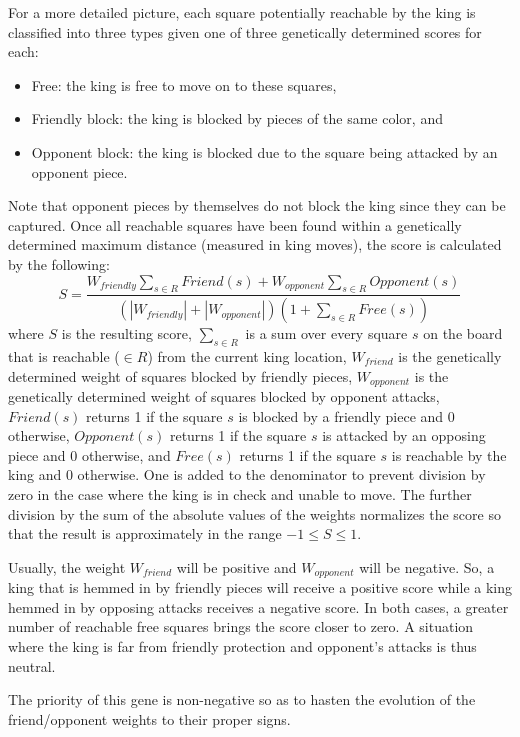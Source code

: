 \documentclass[letterpaper]{article}
\renewcommand{\_}{\allowbreak\textunderscore\allowbreak}
\begin{document}
For a more detailed picture, each square potentially reachable by the king is classified into three types given one of three genetically determined scores for each:
\begin{itemize}
	\item Free: the king is free to move on to these squares,
	\item Friendly block: the king is blocked by pieces of the same color, and
	\item Opponent block: the king is blocked due to the square being attacked by an opponent piece.
\end{itemize}
Note that opponent pieces by themselves do not block the king since they can be captured. Once all reachable squares have been found within a genetically determined maximum distance (measured in king moves), the score is calculated by the following:
\[S = \frac{W_{friendly}\sum_{s \in R}Friend(s) + W_{opponent}\sum_{s \in R}Opponent(s)}{\left(\left|W_{friendly}\right| + \left|W_{opponent}\right|\right)\left(1 + \sum_{s \in R}Free(s)\right)}
\]
where \(S\) is the resulting score, \(\sum_{s \in R}\) is a sum over every square \(s\) on the board that is reachable (\(\in R\)) from the current king location, \(W_{friend}\) is the genetically determined weight of squares blocked by friendly pieces, \(W_{opponent}\) is the genetically determined weight of squares blocked by opponent attacks, \(Friend(s)\) returns 1 if the square \(s\) is blocked by a friendly piece and 0 otherwise, \(Opponent(s)\) returns 1 if the square \(s\) is attacked by an opposing piece and 0 otherwise, and \(Free(s)\) returns 1 if the square \(s\) is reachable by the king and 0 otherwise. One is added to the denominator to prevent division by zero in the case where the king is in check and unable to move. The further division by the sum of the absolute values of the weights normalizes the score so that the result is approximately in the range \(-1 \leq S \leq 1\).

Usually, the weight \(W_{friend}\) will be positive and \(W_{opponent}\) will be negative. So, a king that is hemmed in by friendly pieces will receive a positive score while a king hemmed in by opposing attacks receives a negative score. In both cases, a greater number of reachable free squares brings the score closer to zero. A situation where the king is far from friendly protection and opponent's attacks is thus neutral.

The priority of this gene is non-negative so as to hasten the evolution of the friend/opponent weights to their proper signs.
\end{document}
